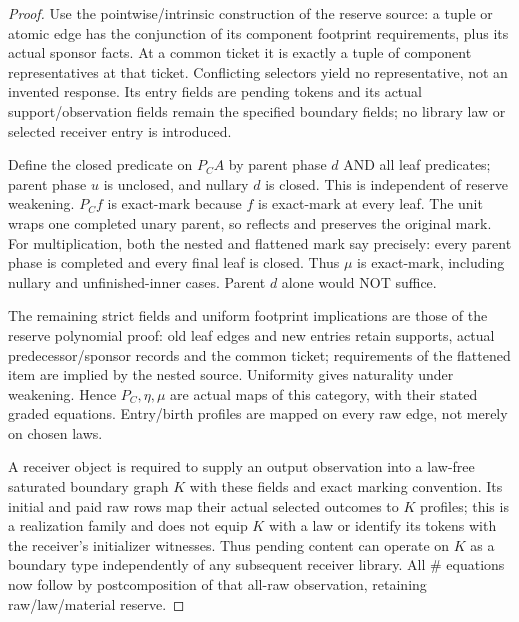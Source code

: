 \documentclass[11pt]{article}
\begin{document}
\begin{proof}
Use the pointwise/intrinsic construction of the reserve source: a tuple or atomic edge has the conjunction of its component footprint requirements, plus its actual sponsor facts. At a common ticket it is exactly a tuple of component representatives at that ticket. Conflicting selectors yield no representative, not an invented response. Its entry fields are pending tokens and its actual support/observation fields remain the specified boundary fields; no library law or selected receiver entry is introduced.

Define the closed predicate on $P_CA$ by parent phase $d$ AND all leaf predicates; parent phase $u$ is unclosed, and nullary $d$ is closed. This is independent of reserve weakening. $P_Cf$ is exact-mark because $f$ is exact-mark at every leaf. The unit wraps one completed unary parent, so reflects and preserves the original mark. For multiplication, both the nested and flattened mark say precisely: every parent phase is completed and every final leaf is closed. Thus $\mu$ is exact-mark, including nullary and unfinished-inner cases. Parent $d$ alone would NOT suffice.

The remaining strict fields and uniform footprint implications are those of the reserve polynomial proof: old leaf edges and new entries retain supports, actual predecessor/sponsor records and the common ticket; requirements of the flattened item are implied by the nested source. Uniformity gives naturality under weakening. Hence $P_C,\eta,\mu$ are actual maps of this category, with their stated graded equations. Entry/birth profiles are mapped on every raw edge, not merely on chosen laws.

A receiver object is required to supply an output observation into a law-free saturated boundary graph $K$ with these fields and exact marking convention. Its initial and paid raw rows map their actual selected outcomes to $K$ profiles; this is a realization family and does not equip $K$ with a law or identify its tokens with the receiver's initializer witnesses. Thus pending content can operate on $K$ as a boundary type independently of any subsequent receiver library. All $\#$ equations now follow by postcomposition of that all-raw observation, retaining raw/law/material reserve.\end{proof}
\end{document}

